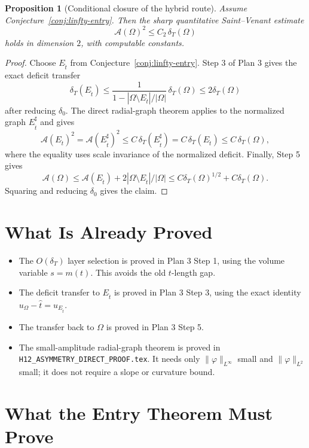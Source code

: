 \documentclass[11pt]{article}
\newtheorem{proposition}[theorem]{Proposition}
\newcommand{\Om}{\Omega}
\newcommand{\cA}{\mathcal A}
\newcommand{\dT}{\delta_T}
\begin{document}
\begin{proposition}[Conditional closure of the hybrid route]
Assume Conjecture~\ref{conj:linfty-entry}.  Then the sharp quantitative
Saint--Venant estimate
\[
   \cA(\Om)^2\le C_2\,\dT(\Om)
\]
holds in dimension \(2\), with computable constants.
\end{proposition}

\begin{proof}
Choose \(E_{\hat t}\) from Conjecture~\ref{conj:linfty-entry}.  Step 3 of
Plan 3 gives the exact deficit transfer
\[
   \dT(E_{\hat t})\le
     \frac{1}{1-|\Om\setminus E_{\hat t}|/|\Om|}\,\dT(\Om)
     \le 2\dT(\Om)
\]
after reducing \(\delta_0\).  The direct radial-graph theorem applies to
the normalized graph \(E_{\hat t}^{\sharp}\) and gives
\[
   \cA(E_{\hat t})^2=\cA(E_{\hat t}^{\sharp})^2
      \le C\,\dT(E_{\hat t}^{\sharp})
      = C\,\dT(E_{\hat t})
      \le C\,\dT(\Om),
\]
where the equality uses scale invariance of the normalized deficit.  Finally,
Step 5 gives
\[
   \cA(\Om)\le \cA(E_{\hat t})+
        2|\Om\setminus E_{\hat t}|/|\Om|
     \le C\dT(\Om)^{1/2}+C\dT(\Om).
\]
Squaring and reducing \(\delta_0\) gives the claim.
\end{proof}

\section{What Is Already Proved}

\begin{itemize}
\item The \(O(\dT)\) layer selection is proved in Plan 3 Step 1, using the
volume variable \(s=m(t)\).  This avoids the old \(t\)-length gap.
\item The deficit transfer to \(E_{\hat t}\) is proved in Plan 3 Step 3,
using the exact identity \(u_\Om-\hat t=u_{E_{\hat t}}\).
\item The transfer back to \(\Om\) is proved in Plan 3 Step 5.
\item The small-amplitude radial-graph theorem is proved in
\texttt{H12\_ASYMMETRY\_DIRECT\_PROOF.tex}.  It needs only
\(\|\varphi\|_{L^\infty}\) small and \(\|\varphi\|_{L^2}\) small; it does
not require a slope or curvature bound.
\end{itemize}

\section{What the Entry Theorem Must Prove}
\end{document}
